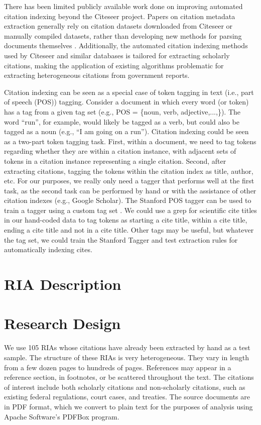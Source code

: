 \documentclass[12pt]{article}
\begin{document}
There has been limited publicly available work done on improving automated citation indexing beyond the Citeseer project. Papers on citation metadata extraction generally rely on citation datasets downloaded from Citeseer or manually compiled datasets, rather than developing new methods for parsing documents themselves \cite{anzaroot2013}. Additionally, the automated citation indexing methods used by Citeseer and similar databases is tailored for extracting scholarly citations, making the application of existing algorithms problematic for extracting heterogeneous citations from government reports.

Citation indexing can be seen as a special case of token tagging in text (i.e., part of speech (POS)) tagging. Consider a document in which every word (or token) has a tag from a given tag set (e.g., POS = \{noun, verb, adjective,...,\}). The word ``run'', for example, would likely be tagged as a verb, but could also be tagged as a noun (e.g., ``I am going on a run''). Citation indexing could be seen as a two-part token tagging task. First, within a document, we need to tag tokens regarding whether they are within a citation instance, with adjacent sets of tokens in a citation instance representing a single citation. Second, after extracting citations, tagging the tokens within the citation index as title, author, etc. For our purposes, we really only need a tagger that performs well at the first task, as the second task can be performed by hand or with the assistance of other citation indexes (e.g., Google Scholar). The Stanford POS tagger can be used to train a tagger using a custom tag set \cite{toutanova2003}. We could use a grep for scientific cite titles in our hand-coded data to tag tokens as starting a cite title, within a cite title, ending a cite title and not in a cite title. Other tags may be useful, but whatever the tag set, we could train the Stanford Tagger and test extraction rules for automatically indexing cites.  

\section{RIA Description}

\section{Research Design}
We use 105 RIAs whose citations have already been extracted by hand as a test sample. The structure of these RIAs is very heterogeneous. They vary in length from a few dozen pages to hundreds of pages. References may appear in a reference section, in footnotes, or be scattered throughout the text. The citations of interest include both scholarly citations and non-scholarly citations, such as existing federal regulations, court cases, and treaties. The source documents are in PDF format, which we convert to plain text for the purposes of analysis using Apache Software's PDFBox program.\\ 
\end{document}
